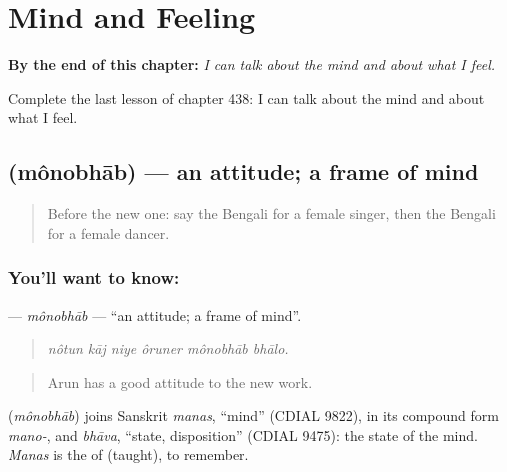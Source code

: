 
\chapter{Mind and Feeling}
\label{ch:bn-mind-and-feeling}

\begin{chapteropening}
\textbf{By the end of this chapter:} \emph{I can talk about the mind and about what I feel.}

Complete the last lesson of chapter 438: I can talk about the mind and about what I feel.
\end{chapteropening}

\section[\texorpdfstring{\bn{মনোভাব} (mônobhāb)}{মনোভাব (mônobhāb)}]{ (mônobhāb) — an attitude; a frame of mind}

\label{lesson:BN-C438-monobhab}



\begin{quote}
Before the new one: say the Bengali for a female singer, then the Bengali for a female dancer.
\end{quote}

\subsection*{You'll want to know: }
\textbf{} — \emph{mônobhāb} — \textquotedblleft{}an attitude; a frame of mind\textquotedblright{}.

\begin{quote}
     
\end{quote}

\begin{quote}
\emph{nôtun kāj niye ôruner mônobhāb bhālo.}
\end{quote}

\begin{quote}
Arun has a good attitude to the new work.
\end{quote}

\begin{cousinweb}
\textbf{} (\emph{mônobhāb}) joins Sanskrit \emph{manas}, \textquotedblleft{}mind\textquotedblright{} (CDIAL 9822), in its compound form \emph{mano-}, and \emph{bhāva}, \textquotedblleft{}state, disposition\textquotedblright{} (CDIAL 9475): the state of the mind. \emph{Manas} is the  of   (taught), to remember.
\end{cousinweb}

